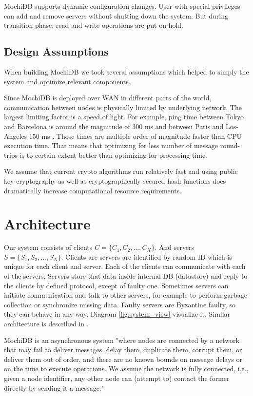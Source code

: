 \documentclass[letterpaper,twocolumn,10pt]{article}
\begin{document}
MochiDB supports dynamic configuration changes. User with special privileges can add and remove servers without shutting down the system. But during transition phase, read and write operations are put on hold.

\subsection{Design Assumptions}
When building MochiDB we took several assumptions which helped to simply the system and optimize relevant components.

Since MochiDB is deployed over WAN in different parts of the world, communication between nodes is physically limited by underlying network. The largest limiting factor is a speed of light. For example, ping time between Tokyo and Barcelona is around the magnitude of 300 ms and between Paris and Los-Angeles 150 ms \cite{PingLatencies}. Those times are multiple order of magnitude faster than CPU execution time. That means that optimizing for less number of message round-trips is to certain extent better than optimizing for processing time.

We assume that current crypto algorithms run relatively fast and using public key cryptography as well as cryptographically secured hash functions does dramatically increase computational resource requirements. 


\section{Architecture}

Our system consists of clients \( C = \{ C_{1},C_{2}, ..., C_{X} \} \). And servers \( S = \{ S_{1}, S_{2}, ..., S_{N} \} \). Clients are servers are identified by random ID which is unique for each client and server. Each of the clients can communicate with each of the servers. Servers store that data inside internal DB (datastore) and reply to the clients by defined protocol, except of faulty one. Sometimes servers can initiate communication and talk to other servers, for example to perform garbage collection or synchronize missing data. Faulty servers are Byzantine faulty, so they can behave in any way. Diagram \ref{fig:system_view} visualize it. Similar architecture is described in \cite{HQ_replication}. 

MochiDB is an asynchronous system "where nodes are connected by a network that may fail to deliver
messages, delay them, duplicate them, corrupt them, or
deliver them out of order, and there are no known bounds
on message delays or on the time to execute operations.
We assume the network is fully connected, i.e., given a
node identifier, any other node can (attempt to) contact
the former directly by sending it a message." \cite{HQ_replication}
\end{document}
